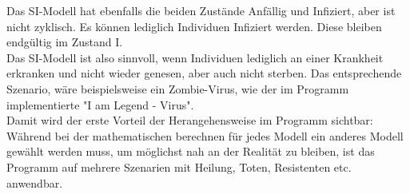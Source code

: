 Das SI-Modell hat ebenfalls die beiden Zustände Anfällig und Infiziert, aber ist nicht zyklisch. Es können lediglich Individuen Infiziert werden. Diese bleiben endgültig im Zustand I.\\
Das SI-Modell ist also sinnvoll, wenn Individuen lediglich an einer Krankheit erkranken und nicht wieder genesen, aber auch nicht sterben. Das entsprechende Szenario, wäre beispielsweise ein Zombie-Virus, wie der im Programm implementierte "I am Legend - Virus".\\
Damit wird der erste Vorteil der Herangehensweise im Programm sichtbar: Während bei der mathematischen berechnen für jedes Modell ein anderes Modell gewählt werden muss, um möglichst nah an der Realität zu bleiben, ist das Programm auf mehrere Szenarien mit Heilung, Toten, Resistenten etc. anwendbar.